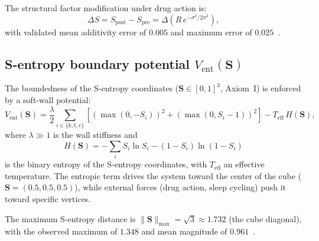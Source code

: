 \documentclass[twocolumn,aps,prl,superscriptaddress,floatfix]{revtex4-2}
\newcommand{\Svec}{\mathbf{S}}
\begin{document}
The structural factor modification under drug action is:
\begin{equation}
\Delta S = S_{\mathrm{post}} - S_{\mathrm{pre}} = \Delta\!\left(R\,e^{-\sigma^2/2\pi^2}\right),
\end{equation}
with validated mean additivity error of $0.005$ and maximum error of $0.025$~\cite{sachikonye2026operator}.

\subsection{S-entropy boundary potential $V_{\mathrm{ent}}(\Svec)$}
\label{sec:vent}

The boundedness of the S-entropy coordinates ($\Svec \in [0,1]^3$, Axiom~I) is enforced by a soft-wall potential:
\begin{equation}
V_{\mathrm{ent}}(\Svec) = \frac{\lambda}{2}\sum_{i \in \{k,t,e\}} \left[(\max(0, -S_i))^2 + (\max(0, S_i - 1))^2\right] - T_{\mathrm{eff}}\,H(\Svec),
\label{eq:vent}
\end{equation}
where $\lambda \gg 1$ is the wall stiffness and
\begin{equation}
H(\Svec) = -\sum_{i} S_i \ln S_i - (1 - S_i)\ln(1 - S_i)
\end{equation}
is the binary entropy of the S-entropy coordinates, with $T_{\mathrm{eff}}$ an effective temperature.
The entropic term drives the system toward the center of the cube ($\Svec = (0.5, 0.5, 0.5)$), while external forces (drug action, sleep cycling) push it toward specific vertices.

The maximum S-entropy distance is $\|\Svec\|_{\mathrm{max}} = \sqrt{3} \approx 1.732$ (the cube diagonal), with the observed maximum of $1.348$ and mean magnitude of $0.961$~\cite{sachikonye2026operator}.
\end{document}
